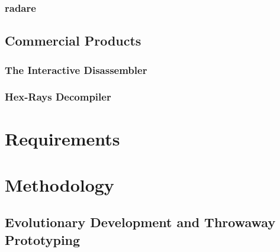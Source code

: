 \documentclass[12pt, a4paper]{article}
\begin{document}
\subsubsection{radare}

\cite{radare}


\subsection{Commercial Products}



\subsubsection{The Interactive Disassembler}


\subsubsection{Hex-Rays Decompiler}



\section{Requirements}


\section{Methodology}


\subsection{Evolutionary Development and Throwaway Prototyping}
\end{document}

